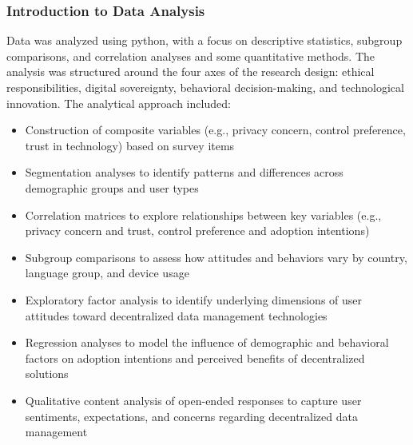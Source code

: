 	\subsubsection{Introduction to Data Analysis}
	Data was analyzed using python, with a focus on descriptive statistics, subgroup comparisons, and correlation analyses and some quantitative methods. The analysis was structured around the four axes of the research design: ethical responsibilities, digital sovereignty, behavioral decision-making, and technological innovation. The analytical approach included:
	\begin{itemize}
		\item Construction of composite variables (e.g., privacy concern, control preference, trust in technology) based on survey items
		\item Segmentation analyses to identify patterns and differences across demographic groups and user types
		\item Correlation matrices to explore relationships between key variables (e.g., privacy concern and trust, control preference and adoption intentions)
		\item Subgroup comparisons to assess how attitudes and behaviors vary by country, language group, and device usage
		\item Exploratory factor analysis to identify underlying dimensions of user attitudes toward decentralized data management technologies
		\item Regression analyses to model the influence of demographic and behavioral factors on adoption intentions and perceived benefits of decentralized solutions
		\item Qualitative content analysis of open-ended responses to capture user sentiments, expectations, and concerns regarding decentralized data management
	\end{itemize}
